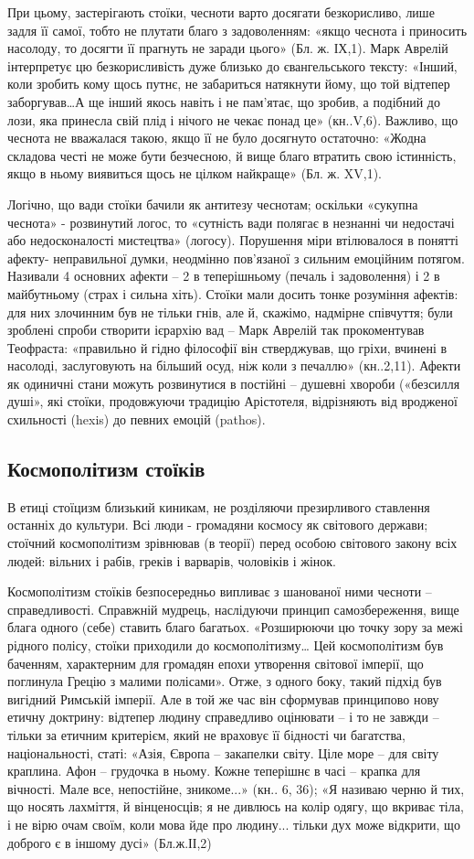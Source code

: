 \documentclass[14pt]{extarticle} %
\begin{document}
При цьому, застерігають стоїки, чесноти варто досягати безкорисливо, лише задля її самої, тобто не плутати благо з задоволенням: «якщо чеснота
і приносить насолоду, то досягти її прагнуть не заради цього» (Бл. ж. ІХ,1). Марк Аврелій інтерпретує цю безкорисливість дуже
близько до євангельського тексту: «Інший, коли зробить кому щось путнє, не забариться натякнути йому, що той відтепер заборгував…А
ще інший якось навіть і не пам’ятає, що зробив, а подібний до лози, яка принесла свій плід і нічого не чекає понад це» (кн..V,6). Важливо,
що чеснота не вважалася такою, якщо її не було досягнуто остаточно: «Жодна складова честі не може бути безчесною, й вище благо втратить свою 
істинність, якщо в ньому виявиться щось не цілком найкраще» (Бл. ж. XV,1). 

Логічно, що вади стоїки бачили як антитезу чеснотам; оскільки «сукупна чеснота» - розвинутий логос, то «сутність вади полягає в незнанні
чи недостачі або недосконалості мистецтва» (логосу). Порушення міри втілювалося в понятті афекту- неправильної думки, неодмінно пов’язаної з
сильним емоційним потягом. Називали 4 основних афекти – 2 в теперішньому (печаль і задоволення) і 2 в майбутньому (страх і сильна хіть). Стоїки
мали досить тонке розуміння афектів: для них злочинним був не тільки гнів, але й, скажімо, надмірне співчуття; були зроблені спроби створити 
ієрархію вад – Марк Аврелій так прокоментував Теофраста: «правильно й гідно філософії він стверджував, що гріхи, вчинені в насолоді, заслуговують 
на більший осуд, ніж коли з печаллю» (кн..2,11). Афекти як одиничні стани можуть розвинутися в постійні – душевні хвороби («безсилля 
душі», які стоїки, продовжуючи традицію Арістотеля, відрізняють від вродженої схильності (hexis) до певних емоцій (pathos). 
\subsection{Космополітизм стоїків}%
В етиці стоїцизм близький киникам, не розділяючи презирливого ставлення останніх до культури. Всі люди - громадяни космосу як світового держави;
стоїчний космополітизм зрівнював (в теорії) перед особою світового закону всіх людей: вільних і рабів, греків і варварів, чоловіків і жінок.

Космополітизм стоїків безпосередньо випливає з шанованої ними чесноти -- справедливості. Справжній мудрець, наслідуючи принцип самозбереження,
вище блага одного (себе) ставить благо багатьох. «Розширюючи цю точку зору за межі рідного полісу, стоїки приходили до космополітизму… Цей 
космополітизм був баченням, характерним для громадян епохи утворення світової імперії, що поглинула Грецію з малими полісами». Отже,
з одного боку, такий підхід був вигідний Римській імперії. Але в той же час він сформував принципово нову етичну доктрину: відтепер людину
справедливо оцінювати – і то не завжди – тільки за етичним критерієм, який не враховує її бідності чи багатства, національності, статі: «Азія,
Європа – закапелки світу. Ціле море – для світу краплина. Афон – грудочка в ньому. Кожне теперішнє в часі – крапка для вічності.
Мале все, непостійне, зникоме...» (кн.. 6, 36); «Я називаю черню й тих, що носять лахміття, й вінценосців; я не дивлюсь на колір одягу, 
що вкриває тіла, і не вірю очам своїм, коли мова йде про людину... тільки дух може відкрити, що доброго є в іншому дусі» (Бл.ж.ІІ,2) 
\end{document}
